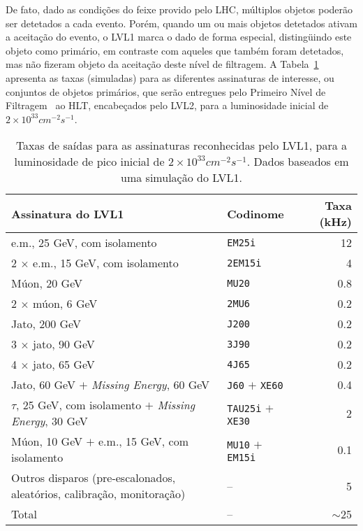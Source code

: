 De fato, dado as condições do feixe provido pelo LHC, múltiplos objetos
poderão ser detetados a cada evento. Porém, quando um ou mais objetos
detetados ativam a aceitação do evento, o LVL1 marca o dado de forma especial,
distingüindo este objeto como primário, em contraste com aqueles que também
foram detetados, mas não fizeram objeto da aceitação deste nível de
filtragem. A Tabela~\ref{tab:l1-rates} apresenta as taxas (simuladas) para as
diferentes assinaturas de interesse, ou conjuntos de objetos primários, que
serão entregues pelo Primeiro Nível de Filtragem~\cite{hlt-tdr} ao HLT,
encabeçados pelo LVL2, para a luminosidade inicial de
$2\times10^{33}cm^{-2}s^{-1}$.

\begin{table}
\begin{center}
\begin{sideways}
\begin{tabular}{|l|l|r|}
\hline
\textbf{Assinatura do LVL1} & \textbf{Codinome} & \textbf{Taxa (kHz)} \\ \hline
e.m., 25 GeV, com isolamento & \texttt{EM25i} & 12 \\ \hline
2 $\times$ e.m., 15 GeV, com isolamento & \texttt{2EM15i} & 4 \\ \hline
Múon, 20 GeV & \texttt{MU20} & 0.8 \\ \hline
2 $\times$ múon, 6 GeV & \texttt{2MU6} & 0.2 \\ \hline
Jato, 200 GeV & \texttt{J200} & 0.2 \\ \hline
3 $\times$ jato, 90 GeV & \texttt{3J90} & 0.2 \\ \hline
4 $\times$ jato, 65 GeV & \texttt{4J65} & 0.2 \\ \hline
Jato, 60 GeV $+$ \textit{Missing Energy}, 60 GeV & \texttt{J60} $+$
\texttt{XE60} & 0.4 \\ \hline
$\tau$, 25 GeV, com isolamento $+$ \textit{Missing Energy}, 30 GeV &
\texttt{TAU25i} $+$ \texttt{XE30} & 2 \\
\hline
Múon, 10 GeV $+$ e.m., 15 GeV, com isolamento & \texttt{MU10} $+$ \texttt{EM15i} & 0.1 \\ \hline
Outros disparos (pre-escalonados, aleatórios, calibração, monitoração) & -- & 5 \\
\hline
Total & -- & $\sim$25 \\ \hline
\end{tabular}
\end{sideways}
\end{center}
\caption{Taxas de saídas para as assinaturas reconhecidas pelo LVL1,
para a luminosidade de pico inicial de $2\times10^{33}cm^{-2}s^{-1}$. Dados
baseados em uma simulação do LVL1.}
\label{tab:l1-rates}
\end{table}

